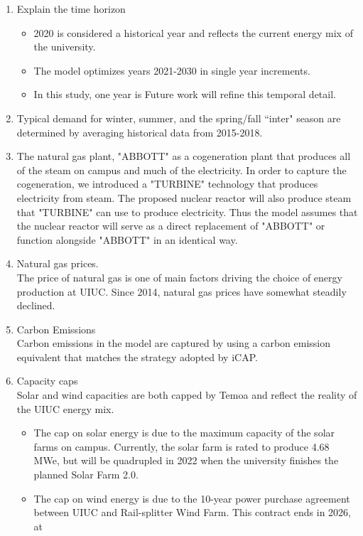 \begin{enumerate}
  \item Explain the time horizon
  \begin{itemize}
    \item 2020 is considered a historical year and reflects the current energy
    mix of the university.
    \item The model optimizes years 2021-2030 in single year increments.
    \item In this study, one year is  Future work will refine this temporal detail.
  \end{itemize}
  \item Typical demand for winter, summer, and the spring/fall ``inter" season
  are determined by averaging historical data from 2015-2018.
  \item The natural gas plant, "ABBOTT" as a cogeneration plant that produces
  all of the steam on campus and much of the electricity. In order to capture
  the cogeneration, we introduced a "TURBINE" technology that produces electricity
  from steam. The proposed nuclear reactor will also produce steam that "TURBINE"
  can use to produce electricity. Thus the model assumes that the nuclear reactor
  will serve as a direct replacement of "ABBOTT" or function alongside "ABBOTT"
  in an identical way.
  \item Natural gas prices.\\
  The price of natural gas is one of main factors driving the choice of energy
  production at UIUC. Since 2014, natural gas prices have somewhat steadily declined.
  \item Carbon Emissions \\
  Carbon emissions in the model are captured by using a carbon emission equivalent
  that matches the strategy adopted by iCAP.
  \item Capacity caps\\
  Solar and wind capacities are both capped by Temoa and reflect the reality of
  the UIUC energy mix.
  \begin{itemize}
    \item The cap on solar energy is due to the maximum capacity of the solar
    farms on campus. Currently, the solar farm is rated to produce 4.68 MWe, but
    will be quadrupled in 2022 when the university finishes the planned Solar Farm 2.0.
    \item The cap on wind energy is due to the 10-year power purchase agreement
    between UIUC and Rail-splitter Wind Farm. This contract ends in 2026, at

\end{itemize}
\end{enumerate}

